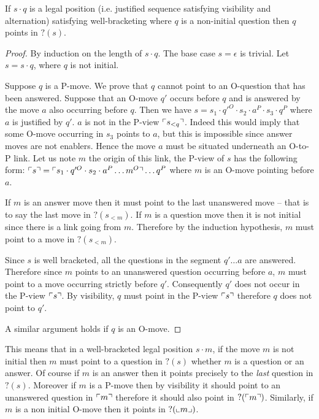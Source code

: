 \begin{lem}
  If $s\cdot q$ is a legal position (i.e. justified sequence satisfying visibility and alternation) satisfying
    well-bracketing where $q$ is a non-initial question then $q$ points in $?(s)$.
\end{lem}
\begin{proof}
    By induction on the length of $s \cdot q$. The base case $s=\epsilon$ is trivial.
    Let $s = s\cdot q$, where $q$ is not initial.

    Suppose $q$ is a P-move. We prove that $q$ cannot point to an O-question that has been answered.
    Suppose that an O-move $q'$ occurs before $q$ and is answered by the move $a$ also occurring before $q$.
    Then we have $s = s_1 \cdot q'^O \cdot s_2 \cdot a^P \cdot s_3 \cdot q^P$ where $a$ is justified by $q'$.
    $a$ is not in the P-view $\ulcorner s_{<q} \urcorner$. Indeed this would imply that some O-move occurring in $s_3$ points to $a$, but this is impossible
    since answer moves are not enablers. Hence the move $a$ must be situated underneath an O-to-P link. Let us note $m$ the origin of this link,
    the P-view of $s$ has the following form: $\ulcorner s \urcorner = \ulcorner s_1\cdot q'^O \cdot s_2 \cdot a^P \ldots m^O \urcorner \ldots q^P$ where $m$ is an O-move pointing before $a$.

    If $m$ is an answer move then it must point to the last unanswered move -- that is to say the last move in $?(s_{<m})$.
    If $m$ is a question move then it is not initial since there is a link going from $m$. Therefore by the induction hypothesis, $m$ must point
    to a move in $?(s_{<m})$.

    Since $s$ is well bracketed, all the questions in the segment $q'\ldots a$ are answered.
    Therefore since $m$ points to an unanswered question occurring before $a$, $m$ must
    point to a move occurring strictly before $q'$. Consequently $q'$ does not occur in the P-view $\ulcorner s \urcorner$.
    By visibility, $q$ must point in the P-view $\ulcorner s \urcorner$ therefore $q$ does not point to $q'$.

    A similar argument holds if $q$ is an O-move.
\end{proof}

This means that in a well-bracketed legal position $s\cdot m$, if
the move $m$ is not initial then $m$ must point to a question in
$?(s)$ whether $m$ is a question or an answer. Of course if $m$ is
an answer then it points precisely to the \emph{last} question in
$?(s)$. Moreover if $m$ is a P-move then by visibility it should
point to an unanswered question in $\ulcorner m \urcorner$ therefore it should
also point in $?(\ulcorner m \urcorner)$. Similarly, if $m$ is a non initial
O-move then it points in $?(\llcorner m \lrcorner)$.

